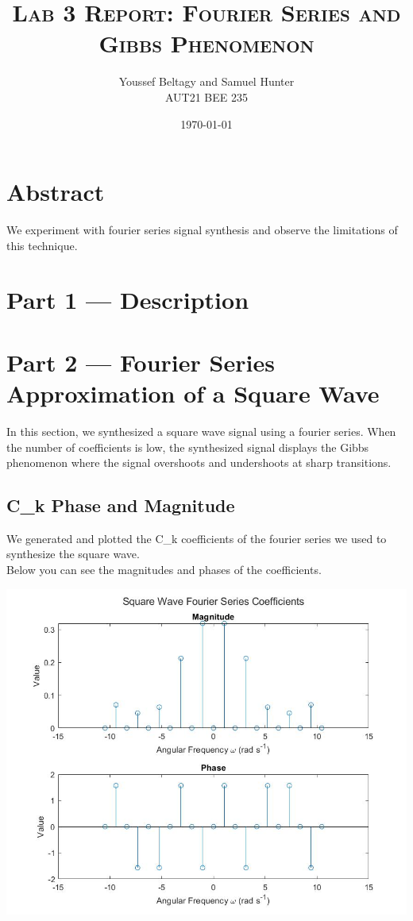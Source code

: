 \documentclass[11pt]{article}
\title{
    \textsc{Lab 3 Report: Fourier Series and Gibbs Phenomenon}
}
\author{
    \Large{Youssef Beltagy and Samuel Hunter} \\
    \large \textsc{AUT21 BEE 235}
}
\date{\today}
\begin{document}
\maketitle %
\pagebreak


\section{Abstract}

We experiment with fourier series signal synthesis and
observe the limitations of this technique.
\section{Part 1 --- Description}


\pagebreak
\section{Part 2 --- Fourier Series Approximation of a Square Wave}

In this section, we synthesized a square wave signal using a fourier series.
When the number of coefficients is low, the synthesized signal displays the Gibbs
phenomenon where the signal overshoots and undershoots at sharp transitions.

\subsection{C\_k Phase and Magnitude}

We generated and plotted the C\_k coefficients of the fourier series
we used to synthesize the square wave.\\

Below you can see the magnitudes and phases of the coefficients.

\includegraphics[width=\textwidth]{ck_values.png}
\end{document}
